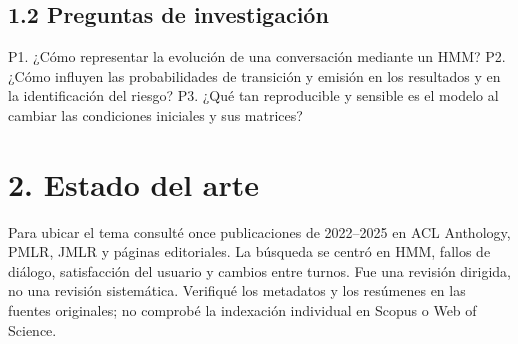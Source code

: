 \documentclass[10pt,a4paper]{article}
\begin{document}
\subsection*{1.2 Preguntas de investigación}
P1. ¿Cómo representar la evolución de una conversación mediante un HMM? P2. ¿Cómo influyen las probabilidades de transición y emisión en los resultados y en la identificación del riesgo? P3. ¿Qué tan reproducible y sensible es el modelo al cambiar las condiciones iniciales y sus matrices?


\clearpage
\section*{2. Estado del arte}
Para ubicar el tema consulté once publicaciones de 2022–2025 en ACL Anthology, PMLR, JMLR y páginas editoriales. La búsqueda se centró en HMM, fallos de diálogo, satisfacción del usuario y cambios entre turnos. Fue una revisión dirigida, no una revisión sistemática. Verifiqué los metadatos y los resúmenes en las fuentes originales; no comprobé la indexación individual en Scopus o Web of Science.
\end{document}
